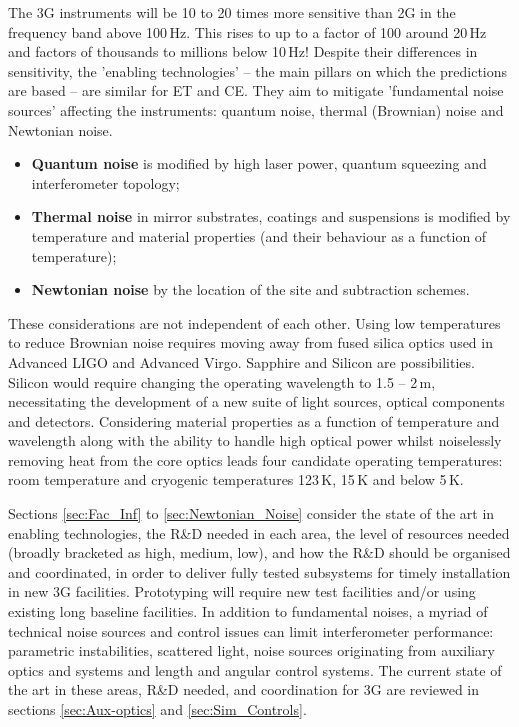 The 3G instruments will be 10 to 20 times more sensitive than 2G in the frequency band above  100\,Hz.  This rises to up to a factor of 100 around 20\,Hz and factors of thousands to millions below 10\,Hz!  Despite their differences in sensitivity, the 'enabling technologies' -- the main pillars on which the predictions are based --  are similar for ET and CE. They aim to mitigate 'fundamental noise sources' affecting the instruments:  quantum noise, thermal (Brownian) noise and Newtonian noise. 
\begin{itemize}
    \item \textbf{Quantum noise} is modified by high laser power, quantum squeezing and interferometer topology;
    \item \textbf{Thermal noise} in mirror substrates, coatings and suspensions is modified by temperature and material properties (and their behaviour as a function of temperature);
    \item \textbf{Newtonian noise} by the location of the site and subtraction schemes.
\end{itemize}
   
These considerations are not independent of each other. Using low temperatures to reduce Brownian noise requires moving away from fused silica optics used in Advanced LIGO and Advanced Virgo. Sapphire and Silicon are possibilities. Silicon would require changing the operating wavelength to 1.5 -- 2\,\micro m, necessitating the development of a new suite of light sources, optical components and detectors.  Considering material properties as a function of temperature and wavelength along with the ability to handle high optical power whilst noiselessly removing heat from the core optics leads four candidate operating temperatures:  room temperature and cryogenic temperatures 123\,K, 15\,K and below 5\,K.  

Sections \ref{sec:Fac_Inf} to \ref{sec:Newtonian_Noise} consider the state of the art in enabling technologies, the R\&D needed in each area, the level of resources needed (broadly bracketed as high, medium, low), and how the R\&D should be organised and coordinated, in order to deliver fully tested subsystems for  timely installation in new 3G facilities. Prototyping will require new test facilities and/or using existing long baseline facilities.
In addition to fundamental noises, a myriad of technical noise sources and control issues can limit interferometer performance:  parametric instabilities, scattered light, noise sources originating from auxiliary optics and systems and length and angular control systems.  The current state of the art in these areas, R\&D needed, and coordination for 3G are reviewed in sections \ref{sec:Aux-optics} and \ref{sec:Sim_Controls}. 

